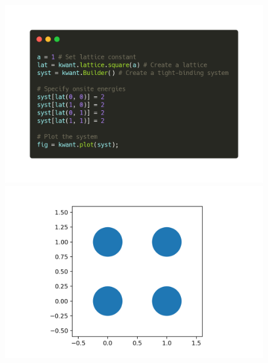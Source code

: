\documentclass[12pt]{article}
\numberwithin{equation}{section}
\begin{document}
\newpage
\begin{figure}
  \centering
  \begin{minipage}{0.49\textwidth}
    \centering
    \includegraphics[width=1.0\textwidth]{./media/example-1-code.png} %
\end{minipage}\hfill
  \begin{minipage}{0.49\textwidth}
      \centering
      \includegraphics[width=1.0\textwidth]{./media/example-1.png} %
  \end{minipage}
\end{figure}
\end{document}
